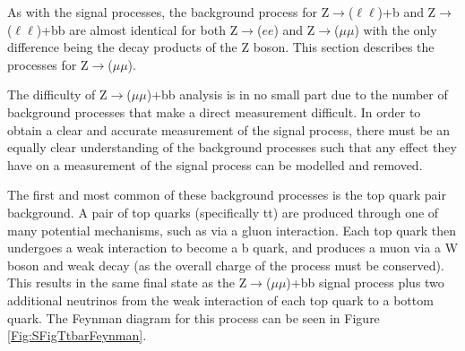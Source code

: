 \documentclass[12pt,a4paper,epsf,portrait,times,epsfig]{report}
\begin{document}
		As with the signal processes, the background process for Z$\rightarrow$($\ell\ell$)+b and Z$\rightarrow$($\ell\ell$)+bb are almost identical for both Z$\rightarrow$($ee$) and Z$\rightarrow$($\mu\mu$) with the only difference being the decay products of the Z boson. This section describes the processes for Z$\rightarrow$($\mu\mu$). \par
		
		The difficulty of Z$\rightarrow$($\mu\mu$)+bb analysis is in no small part due to the number of background processes that make a direct measurement difficult. In order to obtain a clear and accurate measurement of the signal process, there must be an equally clear understanding of the background processes such that any effect they have on a measurement of the signal process can be modelled and removed. \par
		
		The first and most common of these background processes is the top quark pair background. A pair of top quarks (specifically tt) are produced through one of many potential mechanisms, such as via a gluon interaction. Each top quark then undergoes a weak interaction to become a b quark, and produces a muon via a W boson and weak decay (as the overall charge of the process must be conserved). This results in the same final state as the Z$\rightarrow$($\mu\mu$)+bb signal process plus two additional neutrinos from the weak interaction of each top quark to a bottom quark. The Feynman diagram for this process can be seen in Figure \ref{Fig:SFigTtbarFeynman}. \par
		
\end{document}
